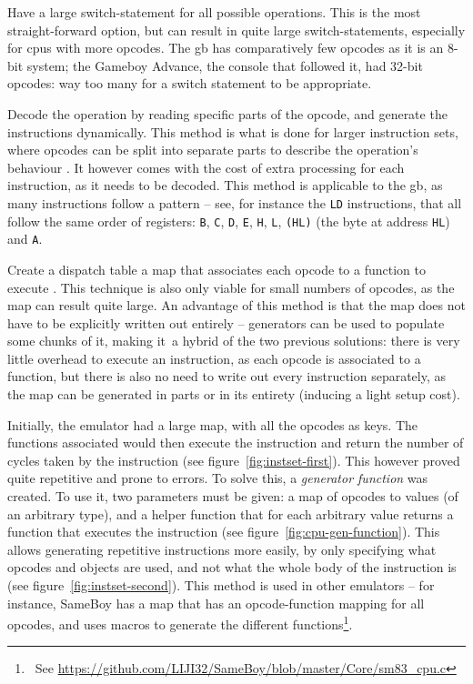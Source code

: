 \documentclass[11pt]{informatics-report}
\newcommand{\ftnt}[1]{\footnote{~See \url{#1}}}
\begin{document}
\begin{compactitem}
    \item Have a large switch-statement for all possible operations. This is the most straight-forward option, but can result in quite large switch-statements, especially for \glspl{cpu} with more opcodes. The \gls{gb} has comparatively few opcodes as it is an 8-bit system; the Gameboy Advance, the console that followed it, had 32-bit opcodes: way too many for a switch statement to be appropriate.
    \item Decode the operation by reading specific parts of the opcode, and generate the instructions dynamically. This method is what is done for larger instruction sets, where opcodes can be split into separate parts to describe the operation's behaviour \cite[ARM CPU Reference]{gbatek}. It however comes with the cost of extra processing for each instruction, as it needs to be decoded. This method is applicable to the \gls{gb}, as many instructions follow a pattern -- see, for instance the \texttt{LD} instructions, that all follow the same order of registers: \texttt{B}, \texttt{C}, \texttt{D}, \texttt{E}, \texttt{H}, \texttt{L}, \texttt{(HL)} (the byte at address \texttt{HL}) and \texttt{A}.
    \item Create a dispatch table a map that associates each opcode to a function to execute \cite{dispatch_table}. This technique is also only viable for small numbers of opcodes, as the map can result quite large. An advantage of this method is that the map does not have to be explicitly written out entirely -- generators can be used to populate some chunks of it, making it a hybrid of the two previous solutions: there is very little overhead to execute an instruction, as each opcode is associated to a function, but there is also no need to write out every instruction separately, as the map can be generated in parts or in its entirety (inducing a light setup cost).
\end{compactitem}

Initially, the emulator had a large map, with all the opcodes as keys. The functions associated would then execute the instruction and return the number of cycles taken by the instruction (see figure~\ref{fig:instset-first}). This however proved quite repetitive and prone to errors. To solve this, a \textit{generator function} was created. To use it, two parameters must be given: a map of opcodes to values (of an arbitrary type), and a helper function that for each arbitrary value returns a function that executes the instruction (see figure~\ref{fig:cpu-gen-function}). This allows generating repetitive instructions more easily, by only specifying what opcodes and objects are used, and not what the whole body of the instruction is (see figure~\ref{fig:instset-second}). This method is used in other emulators -- for instance, SameBoy has a map that has an opcode-function mapping for all opcodes, and uses macros to generate the different functions\ftnt{https://github.com/LIJI32/SameBoy/blob/master/Core/sm83\_cpu.c}.
\end{document}
